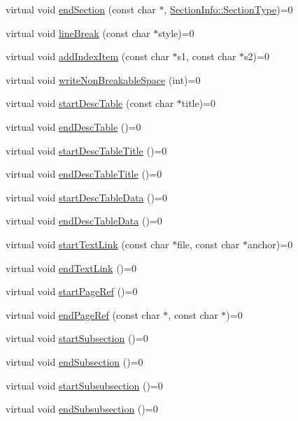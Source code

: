 \begin{DoxyCompactItemize}
\item 
virtual void \hyperlink{class_base_output_doc_interface_a754ab1bd2b1a2cf82ac1207822e76f59}{end\+Section} (const char $\ast$, \hyperlink{struct_section_info_a32308f52dd59422b14fb75a92c90ebf1}{Section\+Info\+::\+Section\+Type})=0
\item 
virtual void \hyperlink{class_base_output_doc_interface_ada61ce97bb848a4e73f60c351e217391}{line\+Break} (const char $\ast$style)=0
\item 
virtual void \hyperlink{class_base_output_doc_interface_acc5ad4f6230310456380f4db9a407161}{add\+Index\+Item} (const char $\ast$s1, const char $\ast$s2)=0
\item 
virtual void \hyperlink{class_base_output_doc_interface_a7a6903af564a1de397adb0887e7e419a}{write\+Non\+Breakable\+Space} (int)=0
\item 
virtual void \hyperlink{class_base_output_doc_interface_ae8d272c529f66d55e23b63a8cbb1abd7}{start\+Desc\+Table} (const char $\ast$title)=0
\item 
virtual void \hyperlink{class_base_output_doc_interface_acad6dba3f360141250109216856eff38}{end\+Desc\+Table} ()=0
\item 
virtual void \hyperlink{class_base_output_doc_interface_a2a026821caecc0397f2c21fd1a1de095}{start\+Desc\+Table\+Title} ()=0
\item 
virtual void \hyperlink{class_base_output_doc_interface_a1106996c286d637c873c819adc5072ba}{end\+Desc\+Table\+Title} ()=0
\item 
virtual void \hyperlink{class_base_output_doc_interface_ae9e8390997be56f776e966c0f906483d}{start\+Desc\+Table\+Data} ()=0
\item 
virtual void \hyperlink{class_base_output_doc_interface_a7448492f455ed3dbff7dbedc00bb7be2}{end\+Desc\+Table\+Data} ()=0
\item 
virtual void \hyperlink{class_base_output_doc_interface_af3e8e537c3a2379071c3573d25a64d03}{start\+Text\+Link} (const char $\ast$file, const char $\ast$anchor)=0
\item 
virtual void \hyperlink{class_base_output_doc_interface_a5b584fb5f7e3d9747c78a4e13715340a}{end\+Text\+Link} ()=0
\item 
virtual void \hyperlink{class_base_output_doc_interface_add686ba33132cc455a70356c77416994}{start\+Page\+Ref} ()=0
\item 
virtual void \hyperlink{class_base_output_doc_interface_a292c5c481f4ba85ab7957bb4b8979d97}{end\+Page\+Ref} (const char $\ast$, const char $\ast$)=0
\item 
virtual void \hyperlink{class_base_output_doc_interface_ab2c4106db654fb639aaca243d3f4a686}{start\+Subsection} ()=0
\item 
virtual void \hyperlink{class_base_output_doc_interface_a3e403e27b8284843a8f3cf7e30e32d2c}{end\+Subsection} ()=0
\item 
virtual void \hyperlink{class_base_output_doc_interface_a7f923f13c625fccde495debb5e31eb35}{start\+Subsubsection} ()=0
\item 
virtual void \hyperlink{class_base_output_doc_interface_a760a6b33b261dafc6625b3cf49ba2124}{end\+Subsubsection} ()=0
\end{DoxyCompactItemize}


